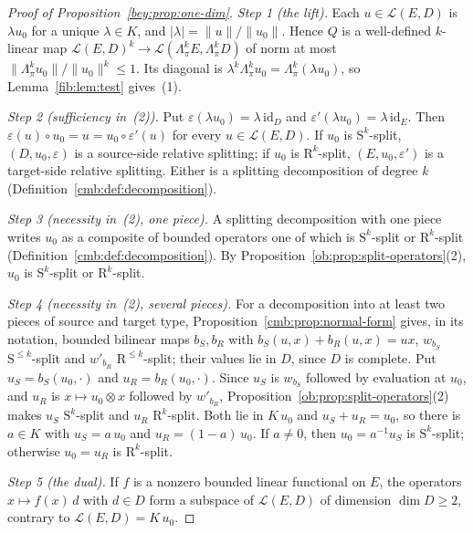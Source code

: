 \documentclass[11pt]{amsart}
\theoremstyle{definition}
\theoremstyle{remark}
\numberwithin{equation}{section}
\newcommand{\cL}{\mathcal L}
\newcommand{\id}{\mathrm{id}}
\newcommand{\abs}[1]{\lvert #1\rvert}
\newcommand{\norm}[1]{\lVert #1\rVert}
\theoremstyle{plain}
\theoremstyle{definition}
\theoremstyle{plain}
\begin{document}
\begin{proof}[Proof of Proposition~\ref{bey:prop:one-dim}]
\emph{Step 1 (the lift).} Each $u\in\cL(E,D)$ is $\lambda u_0$ for a unique $\lambda\in K$, and
$\abs\lambda=\norm u/\norm{u_0}$. Hence $Q$ is a well-defined $k$\nobreakdash-linear map
$\cL(E,D)^k\to\cL(\Lambda^k_\pi E,\Lambda^k_\pi D)$ of norm at most $\norm{\Lambda^k_\pi u_0}/\norm{u_0}^k\le1$. Its
diagonal is $\lambda^k\Lambda^k_\pi u_0=\Lambda^k_\pi(\lambda u_0)$, so Lemma~\ref{fib:lem:test} gives~(1).

\emph{Step 2 (sufficiency in~(2)).} Put $\varepsilon(\lambda u_0)=\lambda\,\id_D$ and
$\varepsilon'(\lambda u_0)=\lambda\,\id_E$. Then $\varepsilon(u)\circ u_0=u=u_0\circ\varepsilon'(u)$ for every
$u\in\cL(E,D)$. If $u_0$ is $\mathrm S^k$-split, $(D,u_0,\varepsilon)$ is a source-side relative splitting; if $u_0$ is
$\mathrm R^k$-split, $(E,u_0,\varepsilon')$ is a target-side relative splitting. Either is a splitting decomposition of
degree $k$ (Definition~\ref{cmb:def:decomposition}).

\emph{Step 3 (necessity in~(2), one piece).} A splitting decomposition with one piece writes $u_0$ as a composite of
bounded operators one of which is $\mathrm S^k$-split or $\mathrm R^k$-split (Definition~\ref{cmb:def:decomposition}).
By Proposition~\ref{ob:prop:split-operators}(2), $u_0$ is $\mathrm S^k$-split or $\mathrm R^k$-split.

\emph{Step 4 (necessity in~(2), several pieces).} For a decomposition into at least two pieces of source and target
type, Proposition~\ref{cmb:prop:normal-form} gives, in its notation, bounded bilinear maps $b_S,b_R$ with
$b_S(u,x)+b_R(u,x)=ux$, $w_{b_S}$ $\mathrm S^{\le k}$-split and $w'_{b_R}$ $\mathrm R^{\le k}$-split; their values lie in
$D$, since $D$ is complete. Put $u_S=b_S(u_0,\cdot)$ and $u_R=b_R(u_0,\cdot)$. Since $u_S$ is $w_{b_S}$ followed by
evaluation at $u_0$, and $u_R$ is $x\mapsto u_0\otimes x$ followed by $w'_{b_R}$,
Proposition~\ref{ob:prop:split-operators}(2) makes $u_S$ $\mathrm S^k$-split and $u_R$ $\mathrm R^k$-split. Both
lie in $K\,u_0$ and $u_S+u_R=u_0$, so there is $a\in K$ with $u_S=a\,u_0$ and $u_R=(1-a)\,u_0$. If $a\ne0$, then
$u_0=a^{-1}u_S$ is $\mathrm S^k$-split; otherwise $u_0=u_R$ is $\mathrm R^k$-split.

\emph{Step 5 (the dual).} If $f$ is a nonzero bounded linear functional on $E$, the operators $x\mapsto f(x)\,d$ with
$d\in D$ form a subspace of $\cL(E,D)$ of dimension $\dim D\ge2$, contrary to $\cL(E,D)=K\,u_0$.
\end{proof}
\end{document}
